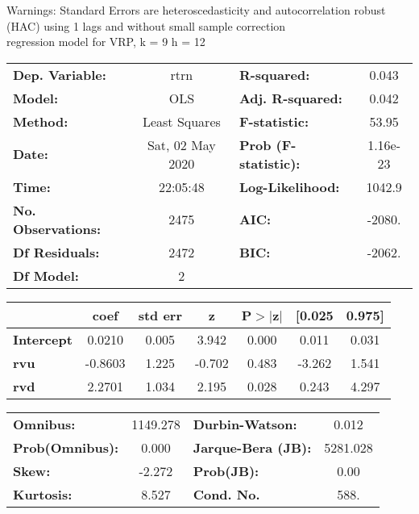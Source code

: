 Warnings: \newline
 [1] Standard Errors are heteroscedasticity and autocorrelation robust (HAC) using 1 lags and without small sample correction\\ 

regression model for VRP, k = 9 h = 12\begin{center}
\begin{tabular}{lclc}
\toprule
\textbf{Dep. Variable:}    &       rtrn       & \textbf{  R-squared:         } &     0.043   \\
\textbf{Model:}            &       OLS        & \textbf{  Adj. R-squared:    } &     0.042   \\
\textbf{Method:}           &  Least Squares   & \textbf{  F-statistic:       } &     53.95   \\
\textbf{Date:}             & Sat, 02 May 2020 & \textbf{  Prob (F-statistic):} &  1.16e-23   \\
\textbf{Time:}             &     22:05:48     & \textbf{  Log-Likelihood:    } &    1042.9   \\
\textbf{No. Observations:} &        2475      & \textbf{  AIC:               } &    -2080.   \\
\textbf{Df Residuals:}     &        2472      & \textbf{  BIC:               } &    -2062.   \\
\textbf{Df Model:}         &           2      & \textbf{                     } &             \\
\bottomrule
\end{tabular}
\begin{tabular}{lcccccc}
                   & \textbf{coef} & \textbf{std err} & \textbf{z} & \textbf{P$> |$z$|$} & \textbf{[0.025} & \textbf{0.975]}  \\
\midrule
\textbf{Intercept} &       0.0210  &        0.005     &     3.942  &         0.000        &        0.011    &        0.031     \\
\textbf{rvu}       &      -0.8603  &        1.225     &    -0.702  &         0.483        &       -3.262    &        1.541     \\
\textbf{rvd}       &       2.2701  &        1.034     &     2.195  &         0.028        &        0.243    &        4.297     \\
\bottomrule
\end{tabular}
\begin{tabular}{lclc}
\textbf{Omnibus:}       & 1149.278 & \textbf{  Durbin-Watson:     } &    0.012  \\
\textbf{Prob(Omnibus):} &   0.000  & \textbf{  Jarque-Bera (JB):  } & 5281.028  \\
\textbf{Skew:}          &  -2.272  & \textbf{  Prob(JB):          } &     0.00  \\
\textbf{Kurtosis:}      &   8.527  & \textbf{  Cond. No.          } &     588.  \\
\bottomrule
\end{tabular}
\end{center}

